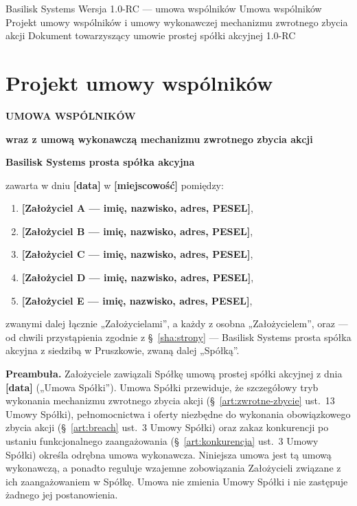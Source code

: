 \documentclass[12pt,a4paper]{report}
\newcommand{\field}[1]{\textbf{[#1]}}
\newcommand{\CompanyFull}{Basilisk Systems prosta spółka akcyjna}
\newcommand{\US}{Umowy Spółki}
\begin{document}
\BusinessPlanTitlePage
  {Basilisk Systems}
  {Wersja 1.0-RC --- umowa wspólników}
  {Umowa wspólników}
  {Projekt umowy wspólników i umowy wykonawczej mechanizmu zwrotnego zbycia akcji}
  {Dokument towarzyszący umowie prostej spółki akcyjnej}
  {1.0-RC}

\tableofcontents
\newpage

\chapter*{Projekt umowy wspólników}

\begin{center}
{\Large\bfseries UMOWA WSPÓLNIKÓW}\par
\vspace{0.2cm}
{\large\bfseries wraz z umową wykonawczą mechanizmu zwrotnego zbycia akcji}\par
\vspace{0.25cm}
{\LARGE\bfseries \CompanyFull}\par
\vspace{0.6cm}
\end{center}

zawarta w dniu \field{data} w \field{miejscowość} pomiędzy:

\begin{enumerate}
  \item \field{Założyciel A --- imię, nazwisko, adres, PESEL},
  \item \field{Założyciel B --- imię, nazwisko, adres, PESEL},
  \item \field{Założyciel C --- imię, nazwisko, adres, PESEL},
  \item \field{Założyciel D --- imię, nazwisko, adres, PESEL},
  \item \field{Założyciel E --- imię, nazwisko, adres, PESEL},
\end{enumerate}

zwanymi dalej łącznie „Założycielami”, a każdy z osobna „Założycielem”, oraz --- od chwili przystąpienia zgodnie z §~\ref{sha:strony} --- \CompanyFull{} z siedzibą w Pruszkowie, zwaną dalej „Spółką”.

\textbf{Preambuła.} Założyciele zawiązali Spółkę umową prostej spółki akcyjnej z dnia \field{data} („Umowa Spółki”). Umowa Spółki przewiduje, że szczegółowy tryb wykonania mechanizmu zwrotnego zbycia akcji (§~\ref{art:zwrotne-zbycie} ust.~13 \US), pełnomocnictwa i oferty niezbędne do wykonania obowiązkowego zbycia akcji (§~\ref{art:breach} ust.~3 \US) oraz zakaz konkurencji po ustaniu funkcjonalnego zaangażowania (§~\ref{art:konkurencja} ust.~3 \US) określa odrębna umowa wykonawcza. Niniejsza umowa jest tą umową wykonawczą, a ponadto reguluje wzajemne zobowiązania Założycieli związane z ich zaangażowaniem w Spółkę. Umowa nie zmienia Umowy Spółki i nie zastępuje żadnego jej postanowienia.
\end{document}
